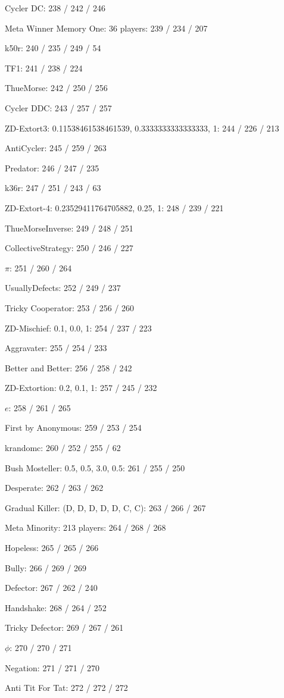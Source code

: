 \item Cycler DC: 238 / 242 / 246
\item Meta Winner Memory One: 36 players: 239 / 234 / 207
\item k50r: 240 / 235 / 249 / 54
\item TF1: 241 / 238 / 224
\item ThueMorse: 242 / 250 / 256
\item Cycler DDC: 243 / 257 / 257
\item ZD-Extort3: 0.11538461538461539, 0.3333333333333333, 1: 244 / 226 / 213
\item AntiCycler: 245 / 259 / 263
\item Predator: 246 / 247 / 235
\item k36r: 247 / 251 / 243 / 63
\item ZD-Extort-4: 0.23529411764705882, 0.25, 1: 248 / 239 / 221
\item ThueMorseInverse: 249 / 248 / 251
\item CollectiveStrategy: 250 / 246 / 227
\item $\pi$: 251 / 260 / 264
\item UsuallyDefects: 252 / 249 / 237
\item Tricky Cooperator: 253 / 256 / 260
\item ZD-Mischief: 0.1, 0.0, 1: 254 / 237 / 223
\item Aggravater: 255 / 254 / 233
\item Better and Better: 256 / 258 / 242
\item ZD-Extortion: 0.2, 0.1, 1: 257 / 245 / 232
\item $e$: 258 / 261 / 265
\item First by Anonymous: 259 / 253 / 254
\item krandomc: 260 / 252 / 255 / 62
\item Bush Mosteller: 0.5, 0.5, 3.0, 0.5: 261 / 255 / 250
\item Desperate: 262 / 263 / 262
\item Gradual Killer: (D, D, D, D, D, C, C): 263 / 266 / 267
\item Meta Minority: 213 players: 264 / 268 / 268
\item Hopeless: 265 / 265 / 266
\item Bully: 266 / 269 / 269
\item Defector: 267 / 262 / 240
\item Handshake: 268 / 264 / 252
\item Tricky Defector: 269 / 267 / 261
\item $\phi$: 270 / 270 / 271
\item Negation: 271 / 271 / 270
\item Anti Tit For Tat: 272 / 272 / 272
